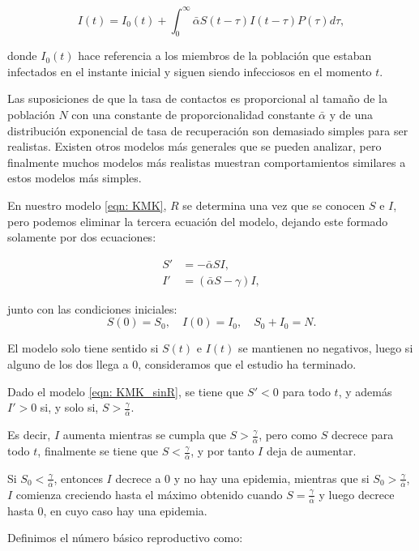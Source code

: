 $$I(t)=I_0(t)+\int_0^\infty \bar{\alpha} S(t-\tau )I(t-\tau )P(\tau ) d\tau ,$$

donde $I_0(t)$ hace referencia a los miembros de la población que estaban infectados en el instante inicial y siguen siendo infecciosos en el momento $t$.

Las suposiciones de que la tasa de contactos es proporcional al tamaño de la población $N$ con una constante de proporcionalidad constante $\bar{\alpha}$ y de una distribución exponencial de tasa de recuperación son demasiado simples para ser realistas. Existen otros modelos más generales que se pueden analizar, pero finalmente muchos modelos más realistas muestran comportamientos similares a estos modelos más simples.

En nuestro modelo \eqref{eqn: KMK}, $R$ se determina una vez que se conocen $S$ e $I$, pero podemos eliminar la tercera ecuación del modelo, dejando este formado solamente por dos ecuaciones:

\begin{equation}
\label{eqn: KMK_sinR}
\begin{aligned}
S' & = -\bar{\alpha} SI, \\
I' & = (\bar{\alpha} S - \gamma ) I,
\end{aligned}
\end{equation}

junto con las condiciones iniciales:
$$S(0)=S_0, \quad I(0)=I_0, \quad S_0+I_0=N.$$

El modelo solo tiene sentido si $S(t)$ e $I(t)$ se mantienen no negativos, luego si alguno de los dos llega a $0$, consideramos que el estudio ha terminado.

\begin{lemma}
Dado el modelo \eqref{eqn: KMK_sinR}, se tiene que $S'<0$ para todo $t$, y además $I'>0$ si, y solo si, $S>\frac{\gamma}{\bar{\alpha}}$.
\end{lemma}

Es decir, $I$ aumenta mientras se cumpla que $S>\frac{\gamma}{\bar{\alpha}}$, pero como $S$ decrece para todo $t$, finalmente se tiene que $S<\frac{\gamma}{\bar{\alpha}}$, y por tanto $I$ deja de aumentar.

Si $S_0<\frac{\gamma}{\bar{\alpha}}$, entonces $I$ decrece a $0$ y no hay una epidemia, mientras que si $S_0>\frac{\gamma}{\bar{\alpha}}$, $I$ comienza creciendo hasta el máximo obtenido cuando $S=\frac{\gamma}{\bar{\alpha}}$ y luego decrece hasta $0$, en cuyo caso hay una epidemia.

Definimos el número básico reproductivo como:

